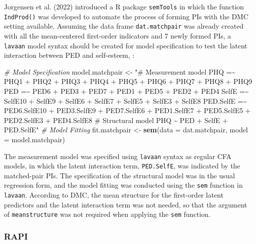 \documentclass[
  man]{apa7}
\newenvironment{Shaded}{\begin{snugshade}}{\end{snugshade}}
\newcommand{\AttributeTok}[1]{\textcolor[rgb]{0.13,0.29,0.53}{#1}}
\newcommand{\CommentTok}[1]{\textcolor[rgb]{0.56,0.35,0.01}{\textit{#1}}}
\newcommand{\FunctionTok}[1]{\textcolor[rgb]{0.13,0.29,0.53}{\textbf{#1}}}
\newcommand{\NormalTok}[1]{#1}
\newcommand{\OtherTok}[1]{\textcolor[rgb]{0.56,0.35,0.01}{#1}}
\newcommand{\StringTok}[1]{\textcolor[rgb]{0.31,0.60,0.02}{#1}}
\begin{document}
Jorgensen et al. (2022) introduced a R package \texttt{semTools} in which the function \texttt{IndProd()} was developed to automate the process of forming PIs with the DMC setting available. Assuming the data frame \texttt{dat.matchpair} was already created with all the mean-centered first-order indicators and 7 newly formed PIs, a \texttt{lavaan} model syntax should be created for model specification to test the latent interaction between PED and self-esteem, :

\begin{Shaded}
\begin{Highlighting}[]
\CommentTok{\# Model Specification}
\NormalTok{model.matchpair }\OtherTok{\textless{}{-}} \StringTok{"\# Measurement model}
\StringTok{                      PHQ =\textasciitilde{} PHQ1 + PHQ2 + PHQ3 + PHQ4 + PHQ5 + PHQ6 + PHQ7 + PHQ8 + PHQ9}
\StringTok{                      PED =\textasciitilde{} PED6 + PED3 + PED7 + PED1 + PED5 + PED2 + PED4}
\StringTok{                      SelfE =\textasciitilde{} SelfE10 + SelfE9 + SelfE6 + SelfE7 + SelfE5 + SelfE3 + SelfE8}
\StringTok{                      PED.SelfE =\textasciitilde{} PED6.SelfE10 + PED3.SelfE9 + PED7.SelfE6 + PED1.SelfE7 + }
\StringTok{                                   PED5.SelfE5 + PED2.SelfE3 + PED4.SelfE8}
\StringTok{                    \# Structural model}
\StringTok{                      PHQ \textasciitilde{} PED + SelfE + PED.SelfE"}
\CommentTok{\# Model Fitting}
\NormalTok{fit.matchpair }\OtherTok{\textless{}{-}} \FunctionTok{sem}\NormalTok{(}\AttributeTok{data =}\NormalTok{ dat.matchpair, }\AttributeTok{model =}\NormalTok{ model.matchpair)}
\end{Highlighting}
\end{Shaded}

The measurement model was specified using \texttt{lavaan} syntax as regular CFA models, in which the latent interaction term, \texttt{PED.SelfE}, was indicated by the matched-pair PIs. The specification of the structural model was in the usual regression form, and the model fitting was conducted using the \texttt{sem} function in \texttt{lavaan}. According to DMC, the mean structure for the first-order latent predictors and the latent interaction term was not needed, so that the argument of \texttt{meanstructure} was not required when applying the \texttt{sem} function.

\hypertarget{rapi}{%
\subsubsection{RAPI}\label{rapi}}
\end{document}
